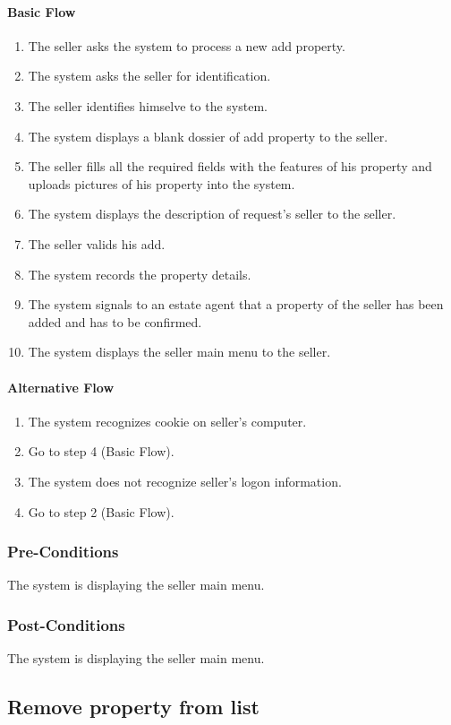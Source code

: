 \documentclass[a4paper,12pt]{article}
\begin{document}
\paragraph{Basic Flow}
\begin{enumerate}
\item The seller asks the system to process a new add property.
\item The system asks the seller for identification.
\item The seller identifies himselve to the system.
\item The system displays a blank dossier of add property to the seller.
\item The seller fills all the required fields with the features of his property and uploads pictures of his property into the system.
\item The system displays the description of request's seller to the seller.
\item The seller valids his add.
\item The system records the property details.
\item The system signals to an estate agent that a property of the seller has been added and has to be confirmed.
\item The system displays the seller main menu to the seller.
\end{enumerate}
\paragraph{Alternative Flow}
\begin{enumerate}
\item The system recognizes cookie on seller's computer. 
\item Go to step 4 (Basic Flow).
\item The system does not recognize seller's logon information.
\item Go to step 2 (Basic Flow).
\end{enumerate}
\subsubsection{Pre-Conditions}
The system is displaying the seller main menu.
\subsubsection{Post-Conditions}
The system is displaying the seller main menu.

\subsection{Remove property from list}
\end{document}
